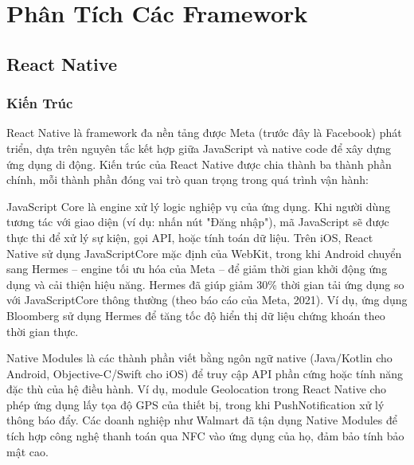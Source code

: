 \section{Phân Tích Các Framework}

\subsection{React Native}
\renewcommand{\labelitemi}{--}    
\subsubsection{Kiến Trúc}
    \begin{flushleft}
        \hspace*{0.8cm}React Native là framework đa nền tảng được Meta (trước đây là Facebook) phát triển, dựa trên nguyên tắc kết hợp giữa JavaScript và native code để xây dựng ứng dụng di động. Kiến trúc của React Native được chia thành ba thành phần chính, mỗi thành phần đóng vai trò quan trọng trong quá trình vận hành:
    \end{flushleft}

    \begin{flushleft}
        \hspace*{0.8cm}JavaScript Core là engine xử lý logic nghiệp vụ của ứng dụng. Khi người dùng tương tác với giao diện (ví dụ: nhấn nút "Đăng nhập"), mã JavaScript sẽ được thực thi để xử lý sự kiện, gọi API, hoặc tính toán dữ liệu. Trên iOS, React Native sử dụng JavaScriptCore mặc định của WebKit, trong khi Android chuyển sang Hermes – engine tối ưu hóa của Meta – để giảm thời gian khởi động ứng dụng và cải thiện hiệu năng. Hermes đã giúp giảm 30\% thời gian tải ứng dụng so với JavaScriptCore thông thường (theo báo cáo của Meta, 2021). Ví dụ, ứng dụng Bloomberg sử dụng Hermes để tăng tốc độ hiển thị dữ liệu chứng khoán theo thời gian thực.
    \end{flushleft}

    \begin{flushleft}
      \hspace*{0.8cm}Native Modules là các thành phần viết bằng ngôn ngữ native (Java/Kotlin cho Android, Objective-C/Swift cho iOS) để truy cập API phần cứng hoặc tính năng đặc thù của hệ điều hành. Ví dụ, module Geolocation trong React Native cho phép ứng dụng lấy tọa độ GPS của thiết bị, trong khi PushNotification xử lý thông báo đẩy. Các doanh nghiệp như Walmart đã tận dụng Native Modules để tích hợp công nghệ thanh toán qua NFC vào ứng dụng của họ, đảm bảo tính bảo mật cao.
    \end{flushleft}

